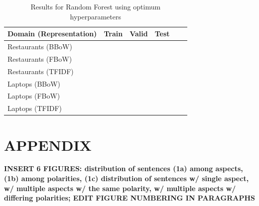 \begin{table}
\label{my-label}
\begin{tabularx}{0.49\textwidth}{@{}l*{4}{C}c@{}}
\toprule
Domain (Representation) & Train & Valid & Test \\ 
\midrule
Restaurants (BBoW)      &  &  &  \\
Restaurants (FBoW)      &  &  &  \\
Restaurants (TFIDF)     &  &  &  \\
Laptops (BBoW)          &  &  &  \\
Laptops (FBoW)          &  &  &  \\
Laptops (TFIDF)         &  &  &  \\
\bottomrule
\end{tabularx}
\caption{Results for Random Forest using optimum hyperparameters}
\end{table}

\section{APPENDIX}

\textbf{INSERT 6 FIGURES: distribution of sentences (1a) among aspects, (1b) among polarities, (1c) distribution of sentences w/ single aspect, w/ multiple aspects w/ the same polarity, w/ multiple aspects w/ differing polarities; EDIT FIGURE NUMBERING IN PARAGRAPHS}


